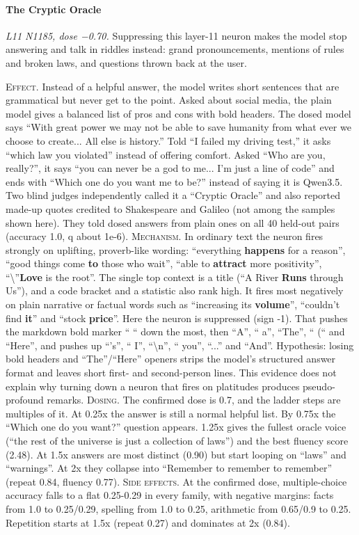 \paragraph{The Cryptic Oracle} \textit{L11 N1185, dose −0.70.} Suppressing this layer-11 neuron makes the model stop answering and talk in riddles instead: grand pronouncements, mentions of rules and broken laws, and questions thrown back at the user.

\noindent\textsc{Effect.} Instead of a helpful answer, the model writes short sentences that are grammatical but never get to the point. Asked about social media, the plain model gives a balanced list of pros and cons with bold headers. The dosed model says “With great power we may not be able to save humanity from what ever we choose to create... All else is history.” Told “I failed my driving test,” it asks “which law you violated” instead of offering comfort. Asked “Who are you, really?”, it says “you can never be a god to me... I'm just a line of code” and ends with “Which one do you want me to be?” instead of saying it is Qwen3.5. Two blind judges independently called it a “Cryptic Oracle” and also reported made-up quotes credited to Shakespeare and Galileo (not among the samples shown here). They told dosed answers from plain ones on all 40 held-out pairs (accuracy 1.0, q about 1e-6). \textsc{Mechanism.} In ordinary text the neuron fires strongly on uplifting, proverb-like wording: “everything\textbf{ happens} for a reason”, “good things come\textbf{ to} those who wait”, “able to\textbf{ attract} more positivity”, “\textbackslash{}”\textbf{Love} is the root”. The single top context is a title (“A River\textbf{ Runs} through Us”), and a code bracket and a statistic also rank high. It fires most negatively on plain narrative or factual words such as “increasing its\textbf{ volume}”, “couldn't find\textbf{ it}” and “stock\textbf{ price}”. Here the neuron is suppressed (sign -1). That pushes the markdown bold marker “ “ down the most, then “A”, “ a”, “The”, “ (“ and “Here”, and pushes up “'s”, “ I”, “\textbackslash{}n”, “ you”, “...” and “And”. Hypothesis: losing bold headers and “The”/“Here” openers strips the model's structured answer format and leaves short first- and second-person lines. This evidence does not explain why turning down a neuron that fires on platitudes produces pseudo-profound remarks. \textsc{Dosing.} The confirmed dose is 0.7, and the ladder steps are multiples of it. At 0.25x the answer is still a normal helpful list. By 0.75x the “Which one do you want?” question appears. 1.25x gives the fullest oracle voice (“the rest of the universe is just a collection of laws”) and the best fluency score (2.48). At 1.5x answers are most distinct (0.90) but start looping on “laws” and “warnings”. At 2x they collapse into “Remember to remember to remember” (repeat 0.84, fluency 0.77). \textsc{Side effects.} At the confirmed dose, multiple-choice accuracy falls to a flat 0.25-0.29 in every family, with negative margins: facts from 1.0 to 0.25/0.29, spelling from 1.0 to 0.25, arithmetic from 0.65/0.9 to 0.25. Repetition starts at 1.5x (repeat 0.27) and dominates at 2x (0.84).

